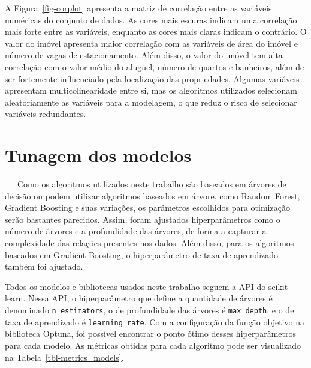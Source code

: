 \documentclass[
  12pt,
  a4paper,
]{scrreprt}
\begin{document}
\vspace{12pt}

A Figura~\ref{fig-corplot} apresenta a matriz de correlação entre as
variáveis numéricas do conjunto de dados. As cores mais escuras indicam
uma correlação mais forte entre as variáveis, enquanto as cores mais
claras indicam o contrário. O valor do imóvel apresenta maior correlação
com as variáveis de área do imóvel e número de vagas de estacionamento.
Além disso, o valor do imóvel tem alta correlação com o valor médio do
aluguel, número de quartos e banheiros, além de ser fortemente
influenciado pela localização das propriedades. Algumas variáveis
apresentam multicolinearidade entre si, mas os algoritmos utilizados
selecionam aleatoriamente as variáveis para a modelagem, o que reduz o
risco de selecionar variáveis redundantes.

\section{Tunagem dos modelos}\label{tunagem-dos-modelos}

~~~Como os algoritmos utilizados neste trabalho são baseados em árvores
de decisão ou podem utilizar algoritmos baseados em árvore, como Random
Forest, Gradient Boosting e suas variações, os parâmetros escolhidos
para otimização serão bastantes parecidos. Assim, foram ajustados
hiperparâmetros como o número de árvores e a profundidade das árvores,
de forma a capturar a complexidade das relações presentes nos dados.
Além disso, para os algoritmos baseados em Gradient Boosting, o
hiperparâmetro de taxa de aprendizado também foi ajustado.

\vspace{12pt}

Todos os modelos e bibliotecas usados neste trabalho seguem a API do
scikit-learn. Nessa API, o hiperparâmetro que define a quantidade de
árvores é denominado \texttt{n\_estimators}, o de profundidade das
árvores é \texttt{max\_depth}, e o de taxa de aprendizado é
\texttt{learning\_rate}. Com a configuração da função objetivo na
biblioteca Optuna, foi possível encontrar o ponto ótimo desses
hiperparâmetros para cada modelo. As métricas obtidas para cada
algoritmo pode ser visualizado na Tabela~\ref{tbl-metrics_models}.
\end{document}
